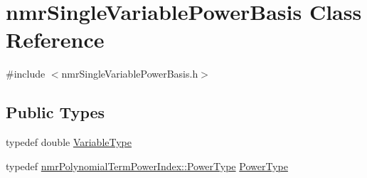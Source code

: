 \hypertarget{classnmr_single_variable_power_basis}{}\section{nmr\+Single\+Variable\+Power\+Basis Class Reference}
\label{classnmr_single_variable_power_basis}


{\ttfamily \#include $<$nmr\+Single\+Variable\+Power\+Basis.\+h$>$}

\subsection*{Public Types}
\begin{DoxyCompactItemize}
\item 
typedef double \hyperlink{classnmr_single_variable_power_basis_a4500df2ac423b7a55c32183275b2d7a2}{Variable\+Type}
\item 
typedef \hyperlink{classnmr_polynomial_term_power_index_a2eec01c3a2c3f56f47982ceffd8e36ed}{nmr\+Polynomial\+Term\+Power\+Index\+::\+Power\+Type} \hyperlink{classnmr_single_variable_power_basis_ae580b034e01160a9fc39455a9356730f}{Power\+Type}
\end{DoxyCompactItemize}
